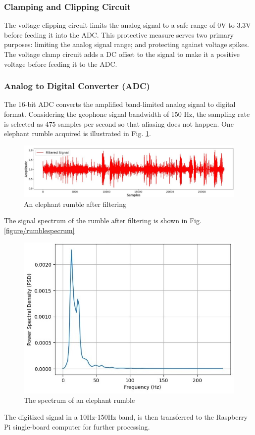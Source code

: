 \documentclass[applsci,article,accept,moreauthors,pdftex]{Definitions/mdpi}
\begin{document}
\subsubsection{Clamping and Clipping Circuit}
The voltage clipping circuit limits the analog signal to a safe range of 0V to 3.3V before feeding it into the ADC. This protective measure serves two primary purposes: limiting the analog signal range; and protecting against voltage spikes. The voltage clamp circuit adds a DC offset to the signal to make it a positive voltage before feeding it to the ADC.
\subsubsection{Analog to Digital Converter (ADC)}
The 16-bit ADC converts the amplified band-limited analog signal to digital format. Considering the geophone signal bandwidth of 150 Hz, the sampling rate is selected as 475 samples per second so that aliasing does not happen. One elephant rumble acquired is illustrated in Fig. \ref{fig_rumblefiltered}.
\begin{figure}[t]
	\centering   \includegraphics[width=1\columnwidth]{figures/rumblefiltered}
	\caption{An elephant rumble after filtering}
	\label{fig_rumblefiltered}
\end{figure}
The signal spectrum of the rumble after filtering is shown in Fig.\ref{figure/rumblespecrum}
\begin{figure}[h]
	\centering   \includegraphics[width=0.7\columnwidth]{figures/rumblespectrum}
	\caption{The spectrum of an elephant rumble}
	\label{fig_rumblespectrum}
\end{figure}
The digitized signal in a 10Hz-150Hz band, is then transferred to the Raspberry Pi single-board computer for further processing. 
\end{document}
